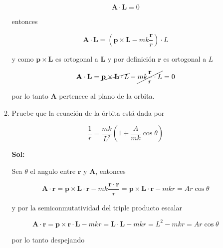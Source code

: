 \documentclass[12pt,a4paper]{article}
\begin{document}
\begin{enumerate}
\begin{enumerate}
    \begin{equation*}
        \mathbf{A} \cdot \mathbf{L} =0
    \end{equation*} 
    
    entonces
    
    \begin{equation*}
        \mathbf{A} \cdot \mathbf{L} = (\mathbf{p} \times \mathbf{L} - mk \frac{\mathbf{r}}{r}) \cdot L
    \end{equation*}
    
    y como $\mathbf{p} \times \mathbf{L}$ es ortogonal a $\mathbf{L}$ y por definición $\mathbf{r}$ es ortogonal a $L$
    
    
    \begin{equation*}
         \mathbf{A} \cdot \mathbf{L} = \cancel{\mathbf{p} \times \mathbf{L}\cdot L
         }- \cancel{mk \frac{\mathbf{r}}{r} \cdot L} = 0
    \end{equation*}
    
    por lo tanto $\mathbf{A}$ pertenece al plano de la orbita.
    
    
    
    
    
    \item Pruebe que la ecuación de la órbita está dada por
    
    
    \begin{equation*}
        \frac{1}{r} = \frac{mk}{L^2} \left(1 + \frac{A}{mk}\cos{\theta}\right)
    \end{equation*}
    
    \textbf{Sol:}
    
    Sea $\theta$ el angulo entre $\mathbf{r}$ y $\mathbf{A}$, entonces
    
    \begin{equation*}
        \mathbf{A} \cdot \mathbf{r} =\mathbf{p} \times \mathbf{L} \cdot \mathbf{r} - mk \frac{\mathbf{r} \cdot \mathbf{r}}{r} =\mathbf{p} \times \mathbf{L} \cdot \mathbf{r} - mk r=Ar \cos{\theta} 
    \end{equation*}
    
    y por la semiconmutatividad del triple producto escalar
    
    \begin{equation*}
        \mathbf{A} \cdot \mathbf{r} =\mathbf{p} \times \mathbf{r} \cdot \mathbf{L} - mk r=\mathbf{L} \cdot \mathbf{L} - mk r=L^2 - mk r=Ar \cos{\theta} 
    \end{equation*}
    
    por lo tanto despejando
    

\end{enumerate}
\end{enumerate}
\end{document}
